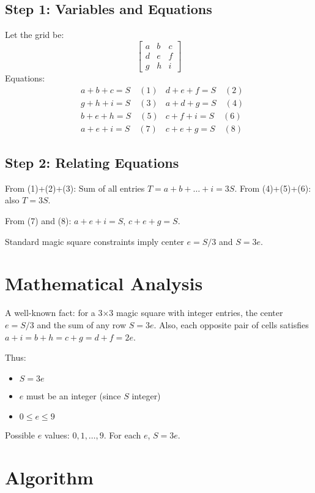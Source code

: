 \documentclass[12pt]{article}
\begin{document}
\subsection*{Step 1: Variables and Equations}
Let the grid be:
\[
\begin{bmatrix}
a & b & c \\
d & e & f \\
g & h & i
\end{bmatrix}
\]
Equations:
\begin{align*}
& a+b+c = S \quad (1) & d+e+f = S \quad (2) \\
& g+h+i = S \quad (3) & a+d+g = S \quad (4) \\
& b+e+h = S \quad (5) & c+f+i = S \quad (6) \\
& a+e+i = S \quad (7) & c+e+g = S \quad (8)
\end{align*}

\subsection*{Step 2: Relating Equations}
From (1)+(2)+(3):  
Sum of all entries $T = a+b+\dots+i = 3S$.  
From (4)+(5)+(6): also $T = 3S$.

From (7) and (8): $a+e+i = S$, $c+e+g = S$.

Standard magic square constraints imply center $e = S/3$ and $S = 3e$.

\section*{Mathematical Analysis}

A well-known fact: for a 3×3 magic square with integer entries, the center $e = S/3$ and the sum of any row $S = 3e$.  
Also, each opposite pair of cells satisfies $a+i = b+h = c+g = d+f = 2e$.

Thus:
\begin{itemize}
    \item $S = 3e$
    \item $e$ must be an integer (since $S$ integer)
    \item $0 \leq e \leq 9$
\end{itemize}

Possible $e$ values: $0,1,\dots,9$. For each $e$, $S = 3e$.

\section*{Algorithm}
\end{document}
